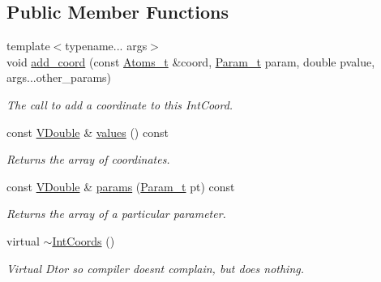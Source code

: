 \subsection*{Public Member Functions}
\begin{DoxyCompactItemize}
\item 
{\footnotesize template$<$typename... args$>$ }\\void \hyperlink{classFManII_1_1IntCoords_aaa13717daa2c47a00c56e8dcb18896b6}{add\+\_\+coord} (const \hyperlink{classFManII_1_1IntCoords_a59ab25571f774fca97644a2ce5ade359}{Atoms\+\_\+t} \&coord, \hyperlink{namespaceFManII_ab331802fde4c5f2564443f1704c25363}{Param\+\_\+t} param, double pvalue, args...\+other\+\_\+params)
\begin{DoxyCompactList}\small\item\em The call to add a coordinate to this Int\+Coord. \end{DoxyCompactList}\item 
const \hyperlink{classFManII_1_1IntCoords_af42df2795dec16350f908cfd5ac2ef06}{V\+Double} \& \hyperlink{classFManII_1_1IntCoords_a8b36508bebeb262d2c41bed1301ad9f9}{values} () const \hypertarget{classFManII_1_1IntCoords_a8b36508bebeb262d2c41bed1301ad9f9}{}\label{classFManII_1_1IntCoords_a8b36508bebeb262d2c41bed1301ad9f9}

\begin{DoxyCompactList}\small\item\em Returns the array of coordinates. \end{DoxyCompactList}\item 
const \hyperlink{classFManII_1_1IntCoords_af42df2795dec16350f908cfd5ac2ef06}{V\+Double} \& \hyperlink{classFManII_1_1IntCoords_ac107ad541179d838052f37538883671a}{params} (\hyperlink{namespaceFManII_ab331802fde4c5f2564443f1704c25363}{Param\+\_\+t} pt) const \hypertarget{classFManII_1_1IntCoords_ac107ad541179d838052f37538883671a}{}\label{classFManII_1_1IntCoords_ac107ad541179d838052f37538883671a}

\begin{DoxyCompactList}\small\item\em Returns the array of a particular parameter. \end{DoxyCompactList}\item 
virtual \hyperlink{classFManII_1_1IntCoords_ad31ec2a0d63bb2fc33677057546d2763}{$\sim$\+Int\+Coords} ()\hypertarget{classFManII_1_1IntCoords_ad31ec2a0d63bb2fc33677057546d2763}{}\label{classFManII_1_1IntCoords_ad31ec2a0d63bb2fc33677057546d2763}

\begin{DoxyCompactList}\small\item\em Virtual Dtor so compiler doesn\textquotesingle{}t complain, but does nothing. \end{DoxyCompactList}\end{DoxyCompactItemize}
